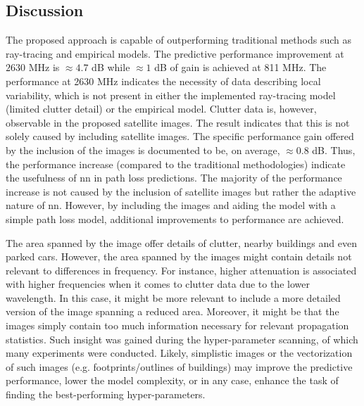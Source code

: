 \subsection{Discussion}
The proposed approach is capable of outperforming traditional methods such as ray-tracing and empirical models. The predictive performance improvement at $2630$ MHz is $\approx 4.7$ dB while $\approx 1$ dB of gain is achieved at 811 MHz. The performance at 2630 MHz indicates the necessity of data describing local variability, which is not present in either the implemented ray-tracing model (limited clutter detail) or the empirical model. Clutter data is, however, observable in the proposed satellite images. The result indicates that this is not solely caused by including satellite images. The specific performance gain offered by the inclusion of the images is documented to be, on average, $\approx 0.8$ dB. Thus, the performance increase (compared to the traditional methodologies) indicate the usefulness of \gls{nn} in path loss predictions. The majority of the performance increase is not caused by the inclusion of satellite images but rather the adaptive nature of \gls{nn}. However, by including the images and aiding the model with a simple path loss model, additional improvements to performance are achieved. 

The area spanned by the image offer details of clutter, nearby buildings and even parked cars. However, the area spanned by the images might contain details not relevant to differences in frequency. For instance, higher attenuation is associated with higher frequencies when it comes to clutter data due to the lower wavelength. In this case, it might be more relevant to include a more detailed version of the image spanning a reduced area. Moreover, it might be that the images simply contain too much information necessary for relevant propagation statistics. Such insight was gained during the hyper-parameter scanning, of which many experiments were conducted. Likely, simplistic images or the vectorization of such images (e.g. footprints/outlines of buildings) may improve the predictive performance, lower the model complexity, or in any case, enhance the task of finding the best-performing hyper-parameters.


